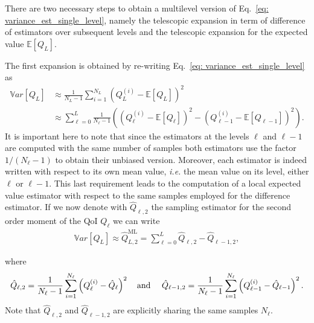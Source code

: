There are two necessary steps to obtain a multilevel version of Eq.~\eqref{eq: variance_est_single_level}, namely the telescopic expansion in term of difference of estimators
over subsequent levels and the telescopic expansion for the expected value $\mathbb{E}\left[Q_L\right]$.

The first expansion is obtained by re-writing Eq.~\eqref{eq: variance_est_single_level} as 
\begin{equation}
\begin{split}
\label{eq: variance_est_ML}
 \mathbb{V}ar\left[Q_L\right] &\approx       \frac{1}{N_L - 1} \sum_{i=1}^{N_L} \left( Q_L^{(i)} - \mathbb{E}\left[Q_L\right] \right)^2 \\
                              &\approx \sum_{\ell=0}^L  \frac{1}{N_\ell - 1} \left( \left( Q_{\ell}^{(i)} - \mathbb{E}\left[Q_{\ell}\right] \right)^2 
                                                                                  - \left( Q_{{\ell-1}}^{(i)} - \mathbb{E}\left[Q_{\ell-1}\right] \right)^2 \right).
\end{split}
\end{equation}
It is important here to note that since the estimators at the levels $\ell$ and $\ell-1$ are computed with the same number of samples both estimators use the factor 
$1/(N_\ell-1)$ to obtain their unbiased version. Moreover, each estimator is indeed written with respect to its own mean value, \textit{i.e.} the mean value on its level,
either $\ell$ or $\ell-1$. This last requirement leads to the computation of a local expected value estimator with respect to the same samples employed for the difference estimator. If we now denote with $\hat{Q}_{\ell,2}$ the sampling estimator for the second order moment of the QoI $Q_\ell$ we can write
\begin{equation}
\begin{split}
\label{eq: variance_est_ML_approximation}
 \mathbb{V}ar\left[Q_L\right] \approx \hat{Q}_{L,2}^{\mathrm{ML}} = \sum_{\ell=0}^L \hat{Q}_{\ell,2} - \hat{Q}_{\ell-1,2},
\end{split}
\end{equation}

where 
\begin{equation}
\label{eq: variance_est_ML_level_terms}
 \hat{Q}_{\ell,2} = \frac{1}{N_\ell - 1} \sum_{i=1}^{N_\ell} \left( Q_\ell^{(i)} - \hat{Q}_\ell \right)^2
\text{\quad  and \quad}
 \hat{Q}_{\ell - 1,2} = \frac{1}{N_\ell - 1} \sum_{i=1}^{N_\ell} \left( Q_{\ell - 1}^{(i)} - \hat{Q}_{\ell - 1} \right)^2.
\end{equation}
Note that $\hat{Q}_{\ell,2}$ and $\hat{Q}_{\ell - 1,2}$ are explicitly sharing the same samples $N_\ell$.


